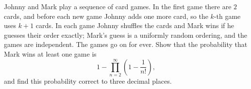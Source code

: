 Johnny and Mark play a sequence of card games. In the first game there are $2$ cards, and before each new game Johnny adds one more card, so the $k$-th game uses $k+1$ cards. In each game Johnny shuffles the cards and Mark wins if he guesses their order exactly; Mark's guess is a uniformly random ordering, and the games are independent. The games go on for ever. Show that the probability that Mark wins at least one game is
\[
1-\prod_{n=2}^{\infty}\left(1-\dfrac{1}{n!}\right),
\]
and find this probability correct to three decimal places.
